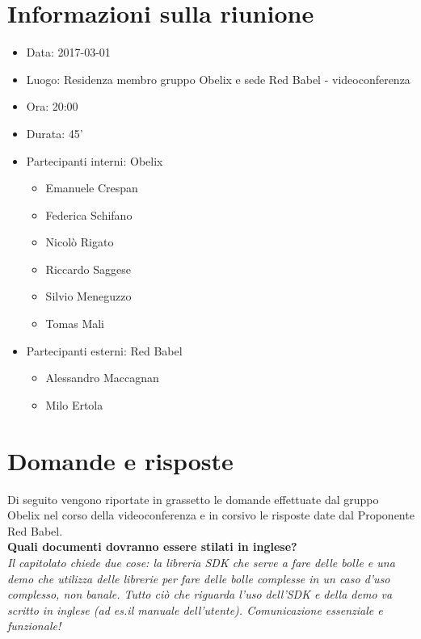\documentclass[10 pt,a4paper, openany]{article}
\date{}
\begin{document}
\section{Informazioni sulla riunione}

\begin{itemize}
\item[] Data: 2017-03-01
\item[] Luogo: Residenza membro gruppo Obelix e sede Red Babel - videoconferenza
\item[] Ora: 20:00
\item[] Durata: 45'
\item[] Partecipanti interni: Obelix
  \begin{itemize}
  \item[] Emanuele Crespan
  \item[] Federica Schifano
  \item[] Nicolò Rigato
  \item[] Riccardo Saggese
  \item[] Silvio Meneguzzo
  \item[] Tomas Mali
  \end{itemize}
\item[] Partecipanti esterni: Red Babel
  \begin{itemize}
  \item[] Alessandro Maccagnan
  \item[] Milo Ertola
  \end{itemize}
\end{itemize}

\section{Domande e risposte}

Di seguito vengono riportate in grassetto le domande effettuate dal gruppo Obelix
nel corso della videoconferenza e in corsivo le risposte date dal Proponente Red Babel.\\

\textbf{Quali documenti dovranno essere stilati in inglese?}\\
\textit{Il capitolato chiede due cose: la libreria SDK che serve a fare delle bolle e una
  demo che utilizza delle librerie per fare delle bolle complesse in un caso d'uso
  complesso, non banale. Tutto ciò che riguarda l'uso dell'SDK e della demo
  va scritto in inglese (ad es.il manuale dell'utente). Comunicazione essenziale e funzionale!}\\
\end{document}
